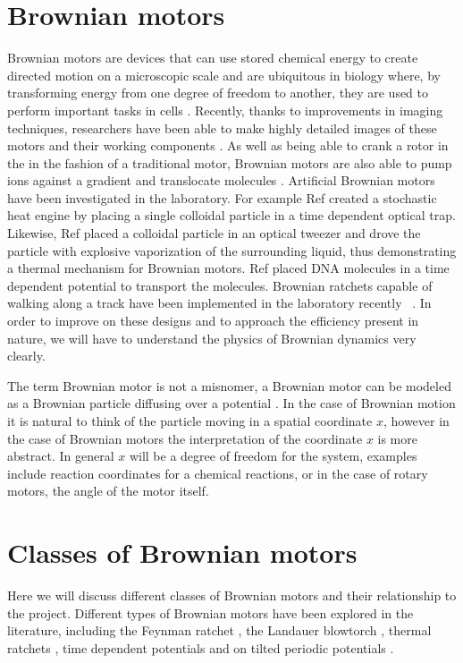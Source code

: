 \section{Brownian motors}
Brownian motors are devices that can use stored chemical energy to create directed motion on a microscopic scale and are ubiquitous in biology where, by transforming energy from one degree of freedom to another, they are used to perform important tasks in cells \cite{PhillipsQuakeMay2006, Magnasco1994,Nelson2014}. Recently, thanks to improvements in imaging techniques, researchers have been able to make highly detailed images of these motors and their working components \cite{YiWeiChang2016}. As well as being able to crank a rotor in the in the fashion of a traditional motor, Brownian motors are also able to pump ions against a gradient and translocate molecules \cite{Magnasco1994, Reimann2001, Leibler1993, leibler1990physical}. Artificial Brownian motors have been investigated in the laboratory. For example Ref \cite{BlickleBechinger2011} created a stochastic heat engine by placing a single colloidal particle in a time dependent optical trap. Likewise, Ref \cite{Pedro2014} placed a colloidal particle in an optical tweezer and drove the particle with explosive vaporization of the surrounding liquid, thus demonstrating a thermal mechanism for Brownian motors. Ref \cite{JoelBader1999} placed DNA molecules in a time dependent potential to transport the molecules. Brownian ratchets capable of walking along a track have been implemented in the laboratory recently  ~\cite{Wang2010,DeliusGeertsemaLeigh2010,DeliusGeertsemaLeighEtAl2010}. In order to improve on these designs and to approach the efficiency present in nature, we will have to understand the physics of Brownian dynamics very clearly.

The term Brownian motor is not a misnomer, a Brownian motor can be modeled as a Brownian particle diffusing over a potential \cite{Reimann2001}. In the case of Brownian motion it is natural to think of the particle moving in a spatial coordinate $x$, however in the case of Brownian motors the interpretation of the coordinate $x$ is more abstract. In general $x$ will be a degree of freedom for the system, examples include reaction coordinates for a chemical reactions, or in the case of rotary motors, the angle of the motor itself.

\section{Classes of Brownian motors} \label{BrownianMotorClasses}
Here we will discuss different classes of Brownian motors and their relationship to the project. Different types of Brownian motors have been explored in the literature, including the Feynman ratchet \cite{Feynman1963}, the Landauer blowtorch \cite{Landauer1988}, thermal ratchets \cite{Pedro2014}, time dependent potentials \cite{JoelBader1999,BlickleBechinger2011} and on tilted periodic potentials \cite{Leibler1993,Magnasco1994}.

